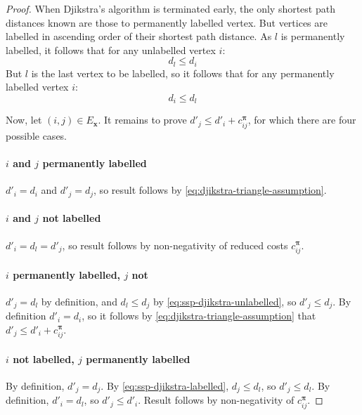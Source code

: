 \begin{proof}
    When Djikstra's algorithm is terminated early, the only shortest path distances known are those to permanently labelled vertex. But vertices are labelled in ascending order of their shortest path distance. As $l$ is permanently labelled, it follows that for any unlabelled vertex $i$:
    \begin{equation} \label{eq:ssp-djikstra-unlabelled}
    d_l \leq d_i
    \end{equation}
    But $l$ is the last vertex to be labelled, so it follows that for any permanently labelled vertex $i$:
    \begin{equation} \label{eq:ssp-djikstra-labelled}
    d_i \leq d_l
    \end{equation}
    
    Now, let $(i,j) \in E_{\mathbf{x}}$. It remains to prove $d'_j \leq d'_i + c^{\boldsymbol{\pi}}_{ij}$, for which there are four possible cases.
    
    \paragraph{$i$ and $j$ permanently labelled} $d'_i = d_i$ and $d'_j = d_j$, so result follows by \cref{eq:djikstra-triangle-assumption}.
    
    \paragraph{$i$ and $j$ not labelled} $d'_i = d_l = d'_j$, so result follows by non-negativity of reduced costs $c^{\boldsymbol{\pi}}_{ij}$.
    
    \paragraph{$i$ permanently labelled, $j$ not} $d'_j = d_l$ by definition, and $d_l \leq d_j$ by \cref{eq:ssp-djikstra-unlabelled}, so $d'_j \leq d_j$. By definition $d'_i = d_i$, so it follows by \cref{eq:djikstra-triangle-assumption} that $d'_j \leq d'_i + c^{\boldsymbol{\pi}}_{ij}$.
    
    \paragraph{$i$ not labelled, $j$ permanently labelled} By definition, $d'_j = d_j$. By \cref{eq:ssp-djikstra-labelled}, $d_j \leq d_l$, so $d'_j \leq d_l$. By definition, $d'_i = d_l$, so $d'_j \leq d'_i$. Result follows by non-negativity of $c^{\boldsymbol{\pi}}_{ij}$.
\end{proof}


